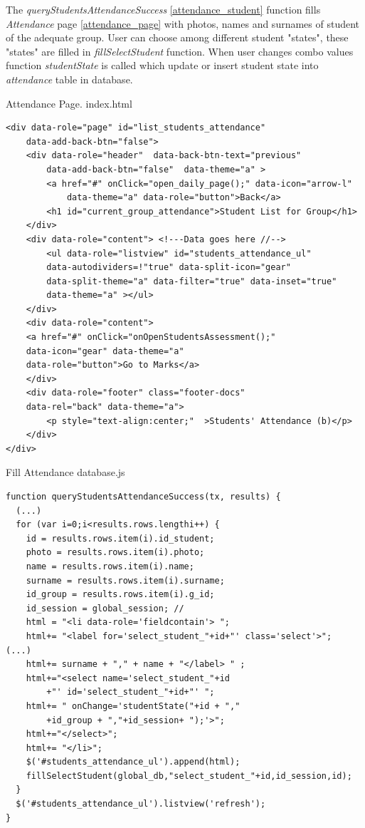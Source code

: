 The \textit{queryStudentsAttendanceSuccess} \ref{attendance_student} function fills \textit{Attendance} page \ref{attendance_page} with photos, names and surnames
of student of the adequate group. User can choose among different student "states", these "states" are filled in
\textit{fillSelectStudent} function. When user changes combo values function \textit{studentState} is called which
update or insert student state into \textit{attendance} table in database.

\begin{bclogo}[couleur=blue!30,arrondi=0.1,ombre=true ] 
{Attendance Page. index.html \label{attendance_page}}
\begin{verbatim}
<div data-role="page" id="list_students_attendance" 
    data-add-back-btn="false">
    <div data-role="header"  data-back-btn-text="previous" 
        data-add-back-btn="false"  data-theme="a" >
        <a href="#" onClick="open_daily_page();" data-icon="arrow-l" 
            data-theme="a" data-role="button">Back</a>
        <h1 id="current_group_attendance">Student List for Group</h1>
    </div>
    <div data-role="content"> <!---Data goes here //-->
        <ul data-role="listview" id="students_attendance_ul" 
        data-autodividers=!"true" data-split-icon="gear" 
        data-split-theme="a" data-filter="true" data-inset="true" 
        data-theme="a" ></ul>
    </div>
    <div data-role="content">   
    <a href="#" onClick="onOpenStudentsAssessment();" 
    data-icon="gear" data-theme="a" 
    data-role="button">Go to Marks</a>
    </div>
    <div data-role="footer" class="footer-docs" 
    data-rel="back" data-theme="a">
        <p style="text-align:center;"  >Students' Attendance (b)</p>
    </div>
</div>
\end{verbatim}
\end{bclogo}


\begin{bclogo}[couleur=blue!30,arrondi=0.1,ombre=true ] 
{Fill Attendance database.js \label{attendance_student}}
\begin{verbatim}
function queryStudentsAttendanceSuccess(tx, results) {
  (...)
  for (var i=0;i<results.rows.lengthi++) {
    id = results.rows.item(i).id_student;
    photo = results.rows.item(i).photo;
    name = results.rows.item(i).name;
    surname = results.rows.item(i).surname;
    id_group = results.rows.item(i).g_id;
    id_session = global_session; //
    html = "<li data-role='fieldcontain'> ";
    html+= "<label for='select_student_"+id+"' class='select'>";
(...)
    html+= surname + "," + name + "</label> " ;
    html+="<select name='select_student_"+id
        +"' id='select_student_"+id+"' ";
    html+= " onChange='studentState("+id + "," 
        +id_group + ","+id_session+ ");'>";
    html+="</select>";
    html+= "</li>";
    $('#students_attendance_ul').append(html);
    fillSelectStudent(global_db,"select_student_"+id,id_session,id);
  } 
  $('#students_attendance_ul').listview('refresh');
}
\end{verbatim}
\end{bclogo}


